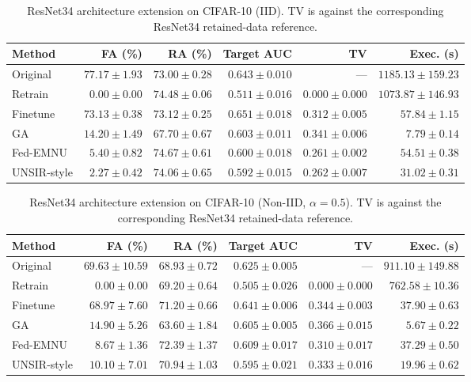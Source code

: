 \documentclass[software,article,submit,moreauthors]{Definitions/mdpi}
\begin{document}
\begin{table}[H]
\caption{ResNet34 architecture extension on CIFAR-10 (IID). TV is against the corresponding ResNet34 retained-data reference.}
\label{tab:r34-iid}
\centering\footnotesize\setlength{\tabcolsep}{3.5pt}
\begin{tabular}{lrrrrr}
\toprule
Method & FA (\%) & RA (\%) & Target AUC & TV & Exec. (s)\\
\midrule
Original & $77.17 \pm 1.93$ & $73.00 \pm 0.28$ & $0.643 \pm 0.010$ & --- & $1185.13 \pm 159.23$\\
Retrain & $0.00 \pm 0.00$ & $74.48 \pm 0.06$ & $0.511 \pm 0.016$ & $0.000 \pm 0.000$ & $1073.87 \pm 146.93$\\
Finetune & $73.13 \pm 0.38$ & $73.12 \pm 0.25$ & $0.651 \pm 0.018$ & $0.312 \pm 0.005$ & $57.84 \pm 1.15$\\
GA & $14.20 \pm 1.49$ & $67.70 \pm 0.67$ & $0.603 \pm 0.011$ & $0.341 \pm 0.006$ & $7.79 \pm 0.14$\\
Fed-EMNU & $5.40 \pm 0.82$ & $74.67 \pm 0.61$ & $0.600 \pm 0.018$ & $0.261 \pm 0.002$ & $54.51 \pm 0.38$\\
UNSIR-style & $2.27 \pm 0.42$ & $74.06 \pm 0.65$ & $0.592 \pm 0.015$ & $0.262 \pm 0.007$ & $31.02 \pm 0.31$\\
\bottomrule
\end{tabular}
\end{table}

\begin{table}[H]
\caption{ResNet34 architecture extension on CIFAR-10 (Non-IID, $\alpha=0.5$). TV is against the corresponding ResNet34 retained-data reference.}
\label{tab:r34-noniid}
\centering\footnotesize\setlength{\tabcolsep}{3.5pt}
\begin{tabular}{lrrrrr}
\toprule
Method & FA (\%) & RA (\%) & Target AUC & TV & Exec. (s)\\
\midrule
Original & $69.63 \pm 10.59$ & $68.93 \pm 0.72$ & $0.625 \pm 0.005$ & --- & $911.10 \pm 149.88$\\
Retrain & $0.00 \pm 0.00$ & $69.20 \pm 0.64$ & $0.505 \pm 0.026$ & $0.000 \pm 0.000$ & $762.58 \pm 10.36$\\
Finetune & $68.97 \pm 7.60$ & $71.20 \pm 0.66$ & $0.641 \pm 0.006$ & $0.344 \pm 0.003$ & $37.90 \pm 0.63$\\
GA & $14.90 \pm 5.26$ & $63.60 \pm 1.84$ & $0.605 \pm 0.005$ & $0.366 \pm 0.015$ & $5.67 \pm 0.22$\\
Fed-EMNU & $8.67 \pm 1.36$ & $72.39 \pm 1.37$ & $0.609 \pm 0.017$ & $0.310 \pm 0.017$ & $37.29 \pm 0.50$\\
UNSIR-style & $10.10 \pm 7.01$ & $70.94 \pm 1.03$ & $0.595 \pm 0.021$ & $0.333 \pm 0.016$ & $19.96 \pm 0.62$\\
\bottomrule
\end{tabular}
\end{table}
\end{document}
